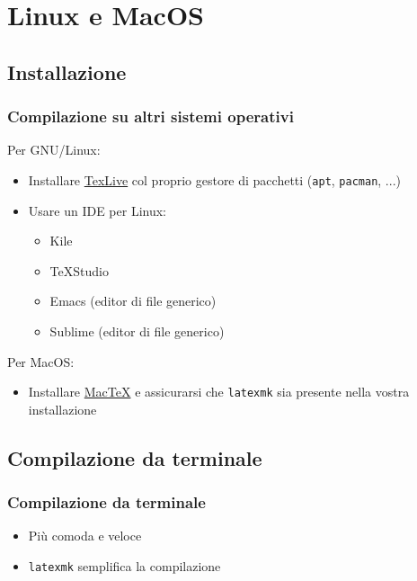 \section{Linux e MacOS}
\subsection{Installazione}
\begin{frame}
  \frametitle{Compilazione su altri sistemi operativi}
  
  Per GNU/Linux:
  \begin{itemize}
   \item Installare \href{http://www.tug.org/texlive/}{TexLive} col proprio 
gestore di pacchetti (\texttt{apt}, \texttt{pacman}, ...)
   \item Usare un IDE per Linux:
   \begin{itemize}
    \item Kile
    \item TeXStudio
    \item Emacs (editor di file generico)
    \item Sublime (editor di file generico)
   \end{itemize}
  \end{itemize}
  
  Per MacOS:
  \begin{itemize}
   \item Installare \href{http://www.tug.org/mactex/}{MacTeX} e assicurarsi che 
\texttt{latexmk} sia presente nella vostra installazione 
  \end{itemize}
\end{frame}


\subsection{Compilazione da terminale}
\begin{frame}
 \frametitle{Compilazione da terminale}
 
 \begin{itemize}
  \item Più comoda e veloce
  \item \texttt{latexmk} semplifica la compilazione
 \end{itemize}
 

\end{frame}
